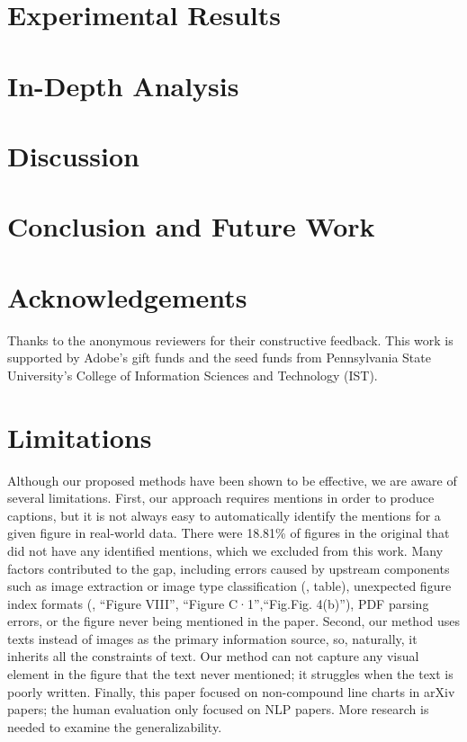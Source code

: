\documentclass[11pt]{article}
\begin{document}


\section{Experimental Results\label{sec:result}}


\section{In-Depth Analysis\label{sec:analysis}}


\section{Discussion\label{sec:discussion}}


\section{Conclusion and Future Work}



\section*{Acknowledgements}
Thanks to the anonymous reviewers for their constructive feedback.
This work is supported by Adobe's gift funds and the seed funds from Pennsylvania State University's College of Information Sciences and Technology (IST).

\section*{Limitations}
Although our proposed methods have been shown to be effective, we are aware of several limitations.
First, our approach requires mentions in order to produce captions, but it is not always easy to automatically identify the mentions for a given figure in real-world data. 
There were 18.81\% of figures in the original \oldDataset that did not have any identified mentions, which we excluded from this work.
Many factors contributed to the gap, including errors caused by upstream components such as image extraction or image type classification (\eg, table), unexpected figure index formats (\eg, ``Figure VIII'', ``Figure C·1'',``Fig.Fig. 4(b)''), PDF parsing errors, or the figure never being mentioned in the paper.
Second, our method uses texts instead of images as the primary information source, so, naturally, it inherits all the constraints of text. 
Our method can not capture any visual element in the figure that the text never mentioned; it struggles when the text is poorly written.
Finally, this paper focused on non-compound line charts in arXiv papers; the human evaluation only focused on NLP papers. 
More research is needed to examine the generalizability.
\end{document}
